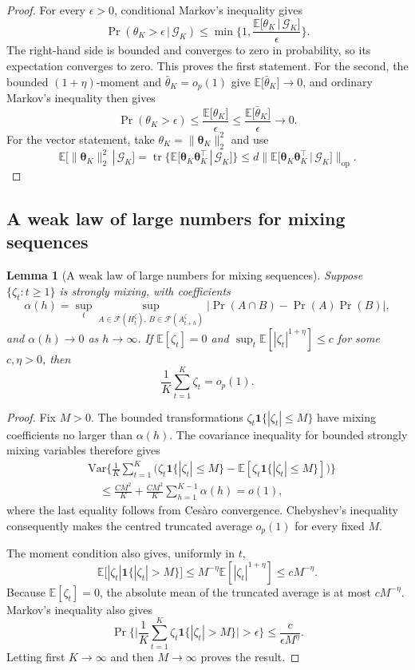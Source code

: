 \documentclass[12pt]{article}
\def\E{\mathbb{E}}
\newtheorem{lemma}[theorem]{Lemma}
\newcommand{\Var}{\mathrm{Var}}
\newcommand\given{\,|\,}
\numberwithin{equation}{section}
\begin{document}
\begin{proof}
For every \(\epsilon>0\), conditional Markov's inequality gives
\[
\Pr(\theta_K>\epsilon\given\mathcal G_K)
\leq
\min\Big\{1,
\frac{\E\big[\theta_K\given\mathcal G_K\big]}{\epsilon}\Big\}.
\]
The right-hand side is bounded and converges to zero in probability, so its
expectation converges to zero. This proves the first statement. For the
second, the bounded \((1+\eta)\)-moment and \(\bar\theta_K=o_p(1)\) give
\(\E\big[\bar\theta_K\big]\to0\), and ordinary Markov's inequality then gives
\[
\Pr(\theta_K>\epsilon)
\leq \frac{\E\big[\theta_K\big]}{\epsilon}
\leq \frac{\E\big[\bar\theta_K\big]}{\epsilon}
\longrightarrow0.
\]
For the vector statement, take
\(\theta_K=\|\boldsymbol\theta_K\|_2^2\) and use
\[
\E\big[\|\boldsymbol\theta_K\|_2^2\given\mathcal G_K\big]
=
\operatorname{tr} \Big\{
\E\big[\boldsymbol\theta_K\boldsymbol\theta_K^\top
\given\mathcal G_K\big]
\Big\}
\leq
d\Big\|
\E\big[\boldsymbol\theta_K\boldsymbol\theta_K^\top
\given\mathcal G_K\big]
\Big\|_{\mathrm{op}}.
\]
\end{proof}

\subsection{A weak law of large numbers for mixing sequences}

\begin{lemma}[A weak law of large numbers for mixing sequences]
\label{lemma:WLLN-MS}
Suppose \(\{\zeta_t:t\geq1\}\) is strongly mixing, with coefficients
\[
\alpha(h)=
\sup_t\sup_{A\in\mathcal F(H_t^\zeta),\,
B\in\mathcal F(A_{t+h}^\zeta)}
\big|\Pr(A\cap B)-\Pr(A)\Pr(B)\big|,
\]
and \(\alpha(h)\to0\) as \(h\to\infty\). If
\(\E[\zeta_t]=0\) and
\(\sup_t\E[|\zeta_t|^{1+\eta}]\leq c\) for some \(c,\eta>0\), then
\[
\frac1K\sum_{t=1}^K\zeta_t=o_p(1).
\]
\end{lemma}

\begin{proof}
Fix \(M>0\). The bounded transformations
\(\zeta_t\mathbf 1\{|\zeta_t|\leq M\}\) have mixing coefficients no
larger than \(\alpha(h)\). The covariance inequality for bounded strongly
mixing variables therefore gives
\begin{align*}
&\Var\Big\{
\frac1K\sum_{t=1}^K
\Big(\zeta_t\mathbf 1\{|\zeta_t|\leq M\}
-\E[\zeta_t\mathbf 1\{|\zeta_t|\leq M\}]\Big)
\Big\}\\
&\quad\leq
\frac{CM^2}{K}
+\frac{CM^2}{K}\sum_{h=1}^{K-1}\alpha(h)
=o(1),
\end{align*}
where the last equality follows from Ces\`aro convergence. Chebyshev's
inequality consequently makes the centred truncated average \(o_p(1)\)
for every fixed \(M\).

The moment condition also gives, uniformly in \(t\),
\[
\E\big[|\zeta_t|\mathbf 1\{|\zeta_t|>M\}\big]
\leq
M^{-\eta}\E[|\zeta_t|^{1+\eta}]
\leq cM^{-\eta}.
\]
Because \(\E[\zeta_t]=0\), the absolute mean of the truncated average is
at most \(cM^{-\eta}\). Markov's inequality also gives
\[
\Pr\Big\{
\Big|\frac1K\sum_{t=1}^K
\zeta_t\mathbf 1\{|\zeta_t|>M\}\Big|>\epsilon
\Big\}
\leq \frac{c}{\epsilon M^\eta}.
\]
Letting first \(K\to\infty\) and then \(M\to\infty\) proves the result.
\end{proof}
\end{document}
